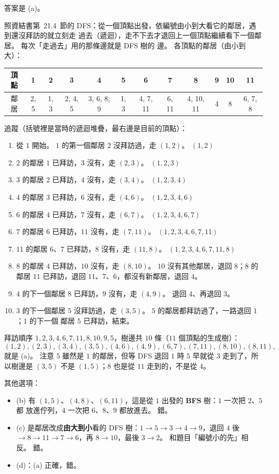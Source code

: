 \begin{pastsoln}
答案是 (a)。

照資結書第~21.4~節的 DFS：從一個頂點出發，依編號由小到大看它的鄰居，遇到還沒拜訪的就立刻走
過去（遞迴），走不下去才退回上一個頂點繼續看下一個鄰居。 每次「走過去」用的那條邊就是 DFS 樹的
邊。 各頂點的鄰居（由小到大）：
\begin{center}
\small
\begin{tabular}{c|ccccccccccc}
頂點 & 1 & 2 & 3 & 4 & 5 & 6 & 7 & 8 & 9 & 10 & 11 \\ \hline
鄰居 & 2, 5 & 1, 3 & 2, 4, 5 & 3, 6, 8, 9 & 1, 3 & 4, 7, 11 & 6, 11 & 4, 10, 11 & 4 & 8 & 6, 7, 8 \\
\end{tabular}
\end{center}
追蹤（括號裡是當時的遞迴堆疊，最右邊是目前的頂點）：
\begin{enumerate}[itemsep=0pt]
\item 從 $1$ 開始。 $1$ 的第一個鄰居 $2$ 沒拜訪過，走 $(1, 2)$。 \hfill $(1, 2)$
\item $2$ 的鄰居 $1$ 已拜訪，$3$ 沒有，走 $(2, 3)$。 \hfill $(1, 2, 3)$
\item $3$ 的鄰居 $2$ 已拜訪，$4$ 沒有，走 $(3, 4)$。 \hfill $(1, 2, 3, 4)$
\item $4$ 的鄰居 $3$ 已拜訪，$6$ 沒有，走 $(4, 6)$。 \hfill $(1, 2, 3, 4, 6)$
\item $6$ 的鄰居 $4$ 已拜訪，$7$ 沒有，走 $(6, 7)$。 \hfill $(1, 2, 3, 4, 6, 7)$
\item $7$ 的鄰居 $6$ 已拜訪，$11$ 沒有，走 $(7, 11)$。 \hfill $(1, 2, 3, 4, 6, 7, 11)$
\item $11$ 的鄰居 $6$、$7$ 已拜訪，$8$ 沒有，走 $(11, 8)$。 \hfill $(1, 2, 3, 4, 6, 7, 11, 8)$
\item $8$ 的鄰居 $4$ 已拜訪，$10$ 沒有，走 $(8, 10)$。 $10$ 沒有其他鄰居，退回 $8$；$8$ 的鄰居 $11$
已拜訪，退回 $11$、$7$、$6$，都沒有新鄰居，退回 $4$。
\item $4$ 的下一個鄰居 $8$ 已拜訪，$9$ 沒有，走 $(4, 9)$。 退回 $4$、再退回 $3$。
\item $3$ 的下一個鄰居 $5$ 沒拜訪過，走 $(3, 5)$。 $5$ 的鄰居都拜訪過了，一路退回 $1$；$1$ 的下一個
鄰居 $5$ 已拜訪，結束。
\end{enumerate}
拜訪順序 $1, 2, 3, 4, 6, 7, 11, 8, 10, 9, 5$，樹邊共 $10$ 條（$11$ 個頂點的生成樹）：
\[
(1, 2), (2, 3), (3, 4), (3, 5), (4, 6), (4, 9), (6, 7), (7, 11), (8, 10), (8, 11),
\]
就是 (a)。 注意 $5$ 雖然是 $1$ 的鄰居，但等 DFS 退回 $1$ 時 $5$ 早就從 $3$ 走到了，所以樹邊是
$(3, 5)$ 不是 $(1, 5)$；$8$ 也是從 $11$ 走到的，不是從 $4$。

其他選項：
\begin{itemize}
\item (b) 有 $(1, 5)$、$(4, 8)$、$(6, 11)$，這是從 $1$ 出發的 \textbf{BFS} 樹：$1$ 一次把 $2$、$5$ 都
放進佇列，$4$ 一次把 $6$、$8$、$9$ 都放進去。 錯。
\item (c) 是鄰居改成\textbf{由大到小}看的 DFS 樹：$1 \to 5 \to 3 \to 4 \to 9$，退回 $4$ 後
$\to 8 \to 11 \to 7 \to 6$，再 $8 \to 10$，最後 $3 \to 2$。 和題目「編號小的先」相反。 錯。
\item (d)：(a) 正確，錯。
\end{itemize}
\end{pastsoln}
